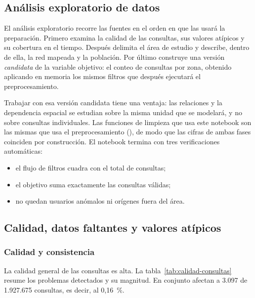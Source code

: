 \subsection{Análisis exploratorio de datos}
\label{sec:eda-recorrido}

El análisis exploratorio recorre las fuentes en el orden en que las usará la preparación.
Primero examina la calidad de las consultas, sus valores atípicos y su cobertura en el
tiempo. Después delimita el área de estudio y describe, dentro de ella, la red mapeada y
la población. Por último construye una versión \emph{candidata} de la variable objetivo:
el conteo de consultas por zona, obtenido aplicando en memoria los mismos filtros que
después ejecutará el preprocesamiento.

Trabajar con esa versión candidata tiene una ventaja: las relaciones y la dependencia
espacial se estudian sobre la misma unidad que se modelará, y no sobre consultas
individuales. Las funciones de limpieza que usa este notebook son las mismas que usa el
preprocesamiento (), de modo que las cifras de ambas fases coinciden
por construcción. El notebook termina con tres verificaciones automáticas:
\begin{itemize}
  \item el flujo de filtros cuadra con el total de consultas;
  \item el objetivo suma exactamente las consultas válidas;
  \item no quedan usuarios anómalos ni orígenes fuera del área.
\end{itemize}

\subsection{Calidad, datos faltantes y valores atípicos}
\label{sec:calidad-datos}

\subsubsection{Calidad y consistencia}

La calidad general de las consultas es alta. La tabla~\ref{tab:calidad-consultas} resume
los problemas detectados y su magnitud. En conjunto afectan a 3.097 de 1.927.675
consultas, es decir, al 0,16~\%.

